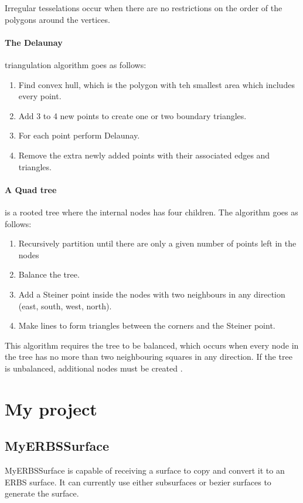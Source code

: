 \documentclass[a4paper,11pt]{article}
\begin{document}
Irregular tesselations occur when there are no restrictions on the order of the polygons around the vertices. 

\paragraph{The Delaunay}
triangulation algorithm goes as follows:
\begin{enumerate}
 \item Find convex hull, which is the polygon with teh smallest area which includes every point. 
 \item Add 3 to 4 new points to create one or two boundary triangles.
 \item For each point perform Delaunay.
 \item Remove the extra newly added points with their associated edges and triangles.
\end{enumerate}

\paragraph{A Quad tree}
is a rooted tree where the internal nodes has four children. The algorithm goes as follows:
\begin{enumerate}
\item Recursively partition until there are only a given number of points left in the nodes
\item Balance the tree.
\item Add a Steiner point inside the nodes with two neighbours in any direction (east, south, west, north).
\item Make lines to form triangles between the corners and the Steiner point.
\end{enumerate}
This algorithm requires the tree to be balanced, which occurs when every node in the tree has no more than two neighbouring squares in any direction. If the tree is unbalanced, additional nodes must be created \cite{book_cg}. 

\section{My project}
\subsection{MyERBSSurface}
MyERBSSurface is capable of receiving a surface to copy and convert it to an ERBS surface. It can currently use either subsurfaces or bezier surfaces to generate the surface. 
\end{document}
